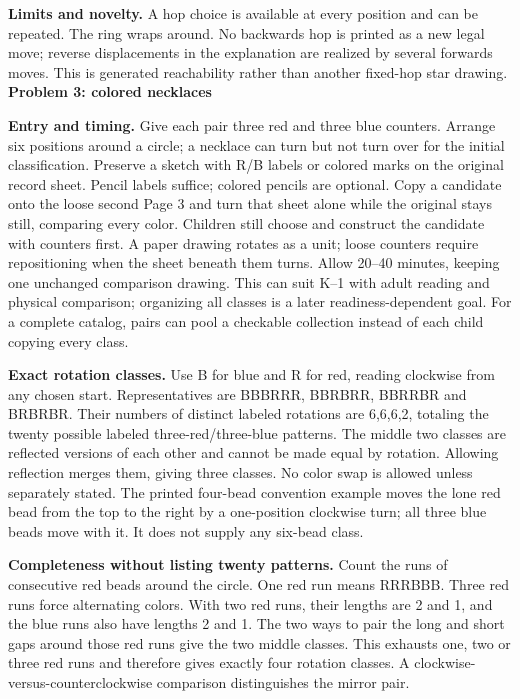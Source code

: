 \documentclass[11pt]{article}
\newcommand\lead[1]{\textbf{#1}\par}
\begin{document}
\textbf{Limits and novelty.} A hop choice is available at every position and can be repeated. The ring wraps around. No backwards hop is printed as a new legal move; reverse displacements in the explanation are realized by several forwards moves. This is generated reachability rather than another fixed-hop star drawing.
\newpage
\lead{Problem 3: colored necklaces}
\textbf{Entry and timing.} Give each pair three red and three blue counters. Arrange six positions around a circle; a necklace can turn but not turn over for the initial classification. Preserve a sketch with R/B labels or colored marks on the original record sheet. Pencil labels suffice; colored pencils are optional. Copy a candidate onto the loose second Page 3 and turn that sheet alone while the original stays still, comparing every color. Children still choose and construct the candidate with counters first. A paper drawing rotates as a unit; loose counters require repositioning when the sheet beneath them turns. Allow 20--40 minutes, keeping one unchanged comparison drawing. This can suit K--1 with adult reading and physical comparison; organizing all classes is a later readiness-dependent goal. For a complete catalog, pairs can pool a checkable collection instead of each child copying every class.

\textbf{Exact rotation classes.} Use B for blue and R for red, reading clockwise from any chosen start. Representatives are BBBRRR, BBRBRR, BBRRBR and BRBRBR. Their numbers of distinct labeled rotations are 6,6,6,2, totaling the twenty possible labeled three-red/three-blue patterns. The middle two classes are reflected versions of each other and cannot be made equal by rotation. Allowing reflection merges them, giving three classes. No color swap is allowed unless separately stated. The printed four-bead convention example moves the lone red bead from the top to the right by a one-position clockwise turn; all three blue beads move with it. It does not supply any six-bead class.

\textbf{Completeness without listing twenty patterns.} Count the runs of consecutive red beads around the circle. One red run means RRRBBB. Three red runs force alternating colors. With two red runs, their lengths are 2 and 1, and the blue runs also have lengths 2 and 1. The two ways to pair the long and short gaps around those red runs give the two middle classes. This exhausts one, two or three red runs and therefore gives exactly four rotation classes. A clockwise-versus-counterclockwise comparison distinguishes the mirror pair.
\end{document}
